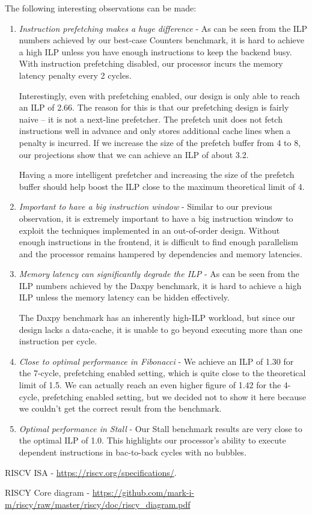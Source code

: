 \documentclass{article}
\begin{document}
The following interesting observations can be made:
\begin{enumerate}
	\item \textit{Instruction prefetching makes a huge difference} - As can
	be seen from the ILP numbers achieved by our best-case Counters
	benchmark, it is hard to achieve a high ILP unless you have enough
	instructions to keep the backend busy. With instruction prefetching
	disabled, our processor incurs the memory latency penalty every 2
	cycles. 
	
	Interestingly, even with prefetching enabled, our design is only able
	to reach an ILP of 2.66. The reason for this is that our prefetching
	design is fairly naive -- it is not a next-line prefetcher. The
	prefetch unit does not fetch instructions well in advance and only
	stores additional cache lines when a penalty is incurred. If we
	increase the size of the prefetch buffer from 4 to 8, our projections
	show that we can achieve an ILP of about 3.2. 
	
	Having a more intelligent prefetcher and increasing the size of the
	prefetch buffer should help boost the ILP close to the maximum
	theoretical limit of 4. 
	
	\item \textit{Important to have a big instruction window} - Similar to
	our previous observation, it is extremely important to have a big
	instruction window to exploit the techniques implemented in an
	out-of-order design. Without enough instructions in the frontend, it is
	difficult to find enough parallelism and the processor remains hampered
	by dependencies and memory latencies.
		 
	\item \textit{Memory latency can significantly degrade the ILP} - As
	can be seen from the ILP numbers achieved by the Daxpy benchmark, it is
	hard to achieve a high ILP unless the memory latency can be hidden
	effectively.
	
	The Daxpy benchmark has an inherently high-ILP workload, but since our
	design lacks a data-cache, it is unable to go beyond executing more
	than one instruction per cycle.
	
	\item \textit{Close to optimal performance in Fibonacci} - We achieve
	an ILP of 1.30 for the 7-cycle, prefetching enabled setting, which is
	quite close to the theoretical limit of 1.5. We can actually reach an
	even higher figure of 1.42 for the 4-cycle, prefetching enabled
	setting, but we decided not to show it here because we couldn't get the
	correct result from the benchmark.
	
	\item \textit{Optimal performance in Stall} - Our Stall benchmark
	results are very close to the optimal ILP of 1.0. This highlights our
	processor's ability to execute dependent instructions in bac-to-back
	cycles with no bubbles.

\end{enumerate}


\begin{thebibliography}{9}

  RISCV ISA -  \url{https://riscv.org/specifications/}.
  
  RISCY Core diagram - \url{https://github.com/mark-i-m/riscy/raw/master/riscy/doc/riscy_diagram.pdf}
  

\end{thebibliography}
\end{document}
